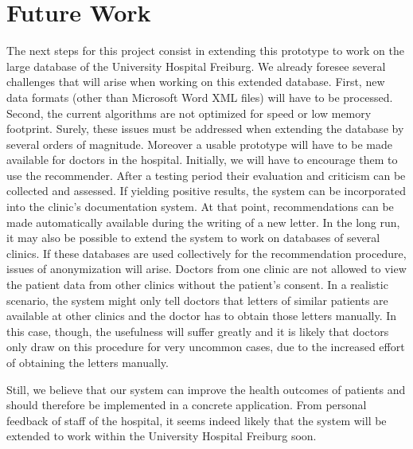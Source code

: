 \section{Future Work}
The next steps for this project consist in extending this prototype to work on the large database of the University Hospital Freiburg. We already foresee several challenges that will arise when working on this extended database. First, new data formats (other than Microsoft Word XML files) will have to be processed. Second, the current algorithms are not optimized for speed or low memory footprint. Surely, these issues must be addressed when extending the database by several orders of magnitude.
Moreover a usable prototype will have to be made available for doctors in the hospital. Initially, we will have to encourage them to use the recommender. After a testing period their evaluation and criticism can be collected and assessed. If yielding positive results, the system can be incorporated into the clinic's documentation system. At that point, recommendations can be made automatically available during the writing of a new letter.
In the long run, it may also be possible to extend the system to work on databases of several clinics. If these databases are used collectively for the recommendation procedure, issues of anonymization will arise. Doctors from one clinic are not allowed to view the patient data from other clinics without the patient's consent. In a realistic scenario, the system might only tell doctors that letters of similar patients are available at other clinics and the doctor has to obtain those letters manually. In this case, though, the usefulness will suffer greatly and it is likely that doctors only draw on this procedure for very uncommon cases, due to the increased effort of obtaining the letters manually.

Still, we believe that our system can improve the health outcomes of patients and should therefore be implemented in a concrete application. From personal feedback of staff of the hospital, it seems indeed likely that the system will be extended to work within the University Hospital Freiburg soon.

